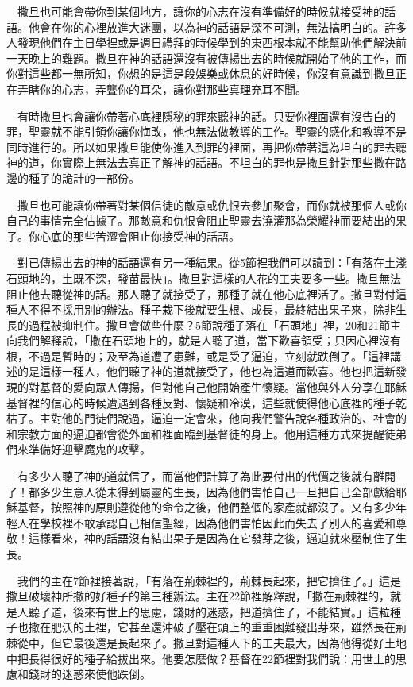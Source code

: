 \documentclass{book}
\begin{document}
　撒旦也可能會帶你到某個地方，讓你的心志在沒有準備好的時候就接受神的話語。他會在你的心裡放進大迷團，以為神的話語是深不可測，無法搞明白的。許多人發現他們在主日學裡或是週日禮拜的時候學到的東西根本就不能幫助他們解決前一天晚上的難題。撒旦在神的話語還沒有被傳揚出去的時候就開始了他的工作，而你對這些都一無所知，你想的是這是段娛樂或休息的好時候，你沒有意識到撒旦正在弄瞎你的心志，弄聾你的耳朵，讓你對那些真理充耳不聞。

　有時撒旦也會讓你帶著心底裡隱秘的罪來聽神的話。只要你裡面還有沒告白的罪，聖靈就不能引領你讓你悔改，他也無法做教導的工作。聖靈的感化和教導不是同時進行的。所以如果撒旦能使你進入到罪的裡面，再把你帶著這為坦白的罪去聽神的道，你實際上無法去真正了解神的話語。不坦白的罪也是撒旦針對那些撒在路邊的種子的詭計的一部份。

　撒旦也可能讓你帶著對某個信徒的敵意或仇恨去參加聚會，而你就被那個人或你自己的事情完全佔據了。那敵意和仇恨會阻止聖靈去澆灌那為榮耀神而要結出的果子。你心底的那些苦澀會阻止你接受神的話語。

　對已傳揚出去的神的話語還有另一種結果。從5節裡我們可以讀到：「有落在土淺石頭地的，土既不深，發苗最快」。撒旦對這樣的人花的工夫要多一些。撒旦無法阻止他去聽從神的話。那人聽了就接受了，那種子就在他心底裡活了。撒旦對付這種人不得不採用別的辦法。種子栽下後就要生根、成長，最終結出果子來，除非生長的過程被抑制住。撒旦會做些什麼？5節說種子落在「石頭地」裡，20和21節主向我們解釋說，「撒在石頭地上的，就是人聽了道，當下歡喜領受；只因心裡沒有根，不過是暫時的；及至為道遭了患難，或是受了逼迫，立刻就跌倒了。「這裡講述的是這樣一種人，他們聽了神的道就接受了，他也為這道而歡喜。他也把這新發現的對基督的愛向眾人傳揚，但對他自己他開始產生懷疑。當他與外人分享在耶穌基督裡的信心的時候遭遇到各種反對、懷疑和冷漠，這些就使得他心底裡的種子乾枯了。主對他的門徒們說過，逼迫一定會來，他向我們警告說各種政治的、社會的和宗教方面的逼迫都會從外面和裡面臨到基督徒的身上。他用這種方式來提醒徒弟們來準備好迎擊魔鬼的攻擊。

　有多少人聽了神的道就信了，而當他們計算了為此要付出的代價之後就有離開了！都多少生意人從未得到屬靈的生長，因為他們害怕自己一旦把自己全部獻給耶穌基督，按照神的原則遵從他的命令之後，他們整個的家產就都沒了。又有多少年輕人在學校裡不敢承認自己相信聖經，因為他們害怕因此而失去了別人的喜愛和尊敬！這樣看來，神的話語沒有結出果子是因為在它發芽之後，逼迫就來壓制住了生長。

　我們的主在7節裡接著說，「有落在荊棘裡的，荊棘長起來，把它擠住了。」這是撒旦破壞神所撒的好種子的第三種辦法。主在22節裡解釋說，「撒在荊棘裡的，就是人聽了道，後來有世上的思慮，錢財的迷惑，把道擠住了，不能結實。」這粒種子也撒在肥沃的土裡，它甚至還沖破了壓在頭上的重重困難發出芽來，雖然長在荊棘從中，但它最後還是長起來了。撒旦對這種人下的工夫最大，因為他得從好土地中把長得很好的種子給拔出來。他要怎麼做？基督在22節裡對我們說：用世上的思慮和錢財的迷惑來使他跌倒。
\end{document}
